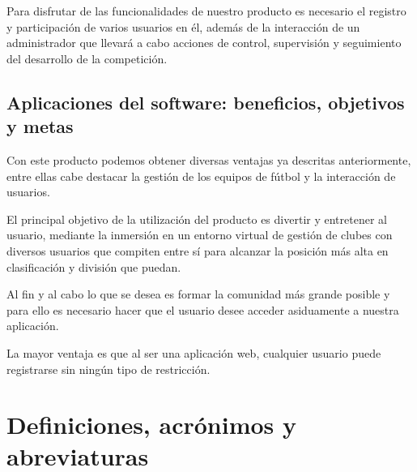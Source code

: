 Para disfrutar de las funcionalidades de nuestro producto es necesario el
registro y participación de varios usuarios en él, además de la interacción de
un administrador que llevará a cabo acciones de control, supervisión y
seguimiento del desarrollo de la competición.

\subsection{Aplicaciones del software: beneficios, objetivos y metas}

Con este producto podemos obtener diversas ventajas ya descritas anteriormente,
entre ellas cabe destacar la gestión de los equipos de fútbol y la interacción
de usuarios.

El principal objetivo de la utilización del producto es divertir y entretener al
usuario, mediante la inmersión en un entorno virtual de gestión de clubes con
diversos usuarios que compiten entre sí para alcanzar la posición más alta en
clasificación y división que puedan.

Al fin y al cabo lo que se desea es formar la comunidad más grande posible y
para ello es necesario hacer que el usuario desee acceder asiduamente a nuestra
aplicación.

La mayor ventaja es que al ser una aplicación web, cualquier usuario puede
registrarse sin ningún tipo de restricción.

\section{Definiciones, acrónimos y abreviaturas}

